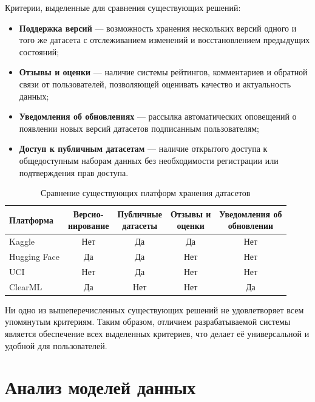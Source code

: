 Критерии, выделенные для сравнения существующих решений:

\begin{itemize}
    \item \textbf{Поддержка версий} — возможность хранения нескольких версий одного и того же датасета с отслеживанием изменений и восстановлением предыдущих состояний;

    \item \textbf{Отзывы и оценки} — наличие системы рейтингов, комментариев и обратной связи от пользователей, позволяющей оценивать качество и актуальность данных;

    \item \textbf{Уведомления об обновлениях} — рассылка автоматических оповещений о появлении новых версий датасетов подписанным пользователям;

    \item \textbf{Доступ к публичным датасетам} — наличие открытого доступа к общедоступным наборам данных без необходимости регистрации или подтверждения прав доступа.
\end{itemize}

\begin{table}[H]
\centering
\caption{Сравнение существующих платформ хранения датасетов}
\begin{tabular}{|l|c|c|c|c|}
\hline
\textbf{Платформа} &
\makecell{\textbf{Версио-} \\ \textbf{нирование}} &
\makecell{\textbf{Публичные} \\ \textbf{датасеты}} &
\makecell{\textbf{Отзывы и} \\ \textbf{оценки}} &
\makecell{\textbf{Уведомления об} \\ \textbf{обновлении}} \\
\hline
Kaggle & Нет & Да & Да & Нет \\
\hline
Hugging Face & Да & Да & Нет & Нет \\
\hline
UCI & Нет & Да & Нет & Нет \\
\hline
ClearML & Да & Нет & Нет & Да \\
\hline
\end{tabular}
\end{table}

Ни одно из вышеперечисленных существующих решений не удовлетворяет всем упомянутым критериям.
Таким образом, отличием разрабатываемой системы является обеспечение всех выделенных критериев,
что делает её универсальной и удобной для пользователей.

\section{Анализ моделей данных}

